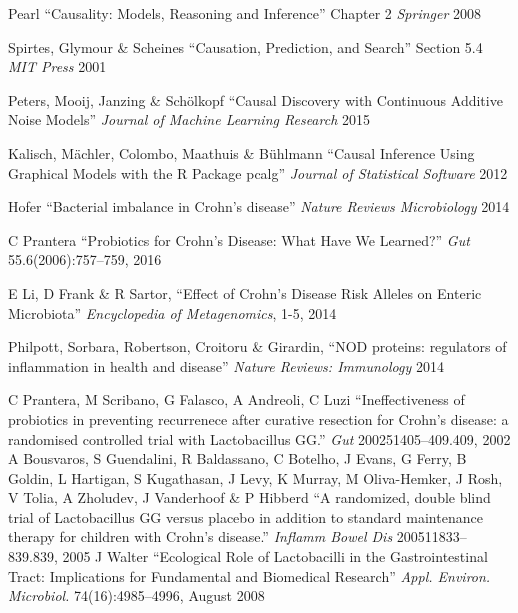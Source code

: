 \documentclass[twocolumn,12pt]{article}
\begin{document}
\begin{thebibliography}{11}
 Pearl ``Causality: Models, Reasoning and Inference''
  Chapter 2 \textit{Springer} 2008

 Spirtes, Glymour \& Scheines ``Causation,
  Prediction, and Search'' Section 5.4 \textit{MIT Press} 2001

 Peters, Mooij, Janzing \& Sch{\"o}lkopf ``Causal
  Discovery with Continuous Additive Noise Models'' \textit{Journal of
    Machine Learning Research} 2015

 Kalisch, M{\"a}chler, Colombo, Maathuis \&
  B{\"u}hlmann ``Causal Inference Using Graphical Models with the R
  Package pcalg'' \textit{Journal of Statistical Software} 2012

 Hofer ``Bacterial imbalance in Crohn's disease''
  \textit{Nature Reviews Microbiology} 2014

 C Prantera ``Probiotics for Crohn’s Disease: What
  Have We Learned?'' \textit{Gut} 55.6(2006):757–759, 2016

 E Li, D Frank \& R Sartor, ``Effect of Crohn’s Disease Risk
  Alleles on Enteric Microbiota'' \textit{Encyclopedia of
    Metagenomics},  1-5, 2014

  Philpott, Sorbara, Robertson, Croitoru \& Girardin,
  ``NOD proteins: regulators of inflammation in health and disease''
  \textit{Nature Reviews: Immunology} 2014
  
 C Prantera, M Scribano, G Falasco, A Andreoli, C Luzi
  ``Ineffectiveness of probiotics in preventing recurrenece after
  curative resection for Crohn's disease: a randomised controlled
  trial with Lactobacillus GG.'' \textit{Gut}  200251405–409.409, 2002
 A Bousvaros,  S Guendalini,  R Baldassano, C Botelho,
  J Evans,  G Ferry,  B Goldin,  L Hartigan,  S Kugathasan,  J Levy,
  K Murray,  M Oliva-Hemker,  J Rosh, V Tolia,  A Zholudev,  J
  Vanderhoof \&  P Hibberd ``A randomized, double blind trial of
  Lactobacillus GG versus placebo in addition to standard maintenance
  therapy for children with Crohn's disease.'' \textit{Inflamm Bowel
    Dis} 200511833–839.839, 2005
 J Walter ``Ecological Role of Lactobacilli in the
  Gastrointestinal Tract: Implications for Fundamental and Biomedical
  Research'' \textit{Appl. Environ. Microbiol.} 74(16):4985–4996, August 2008

\end{thebibliography}
\end{document}
